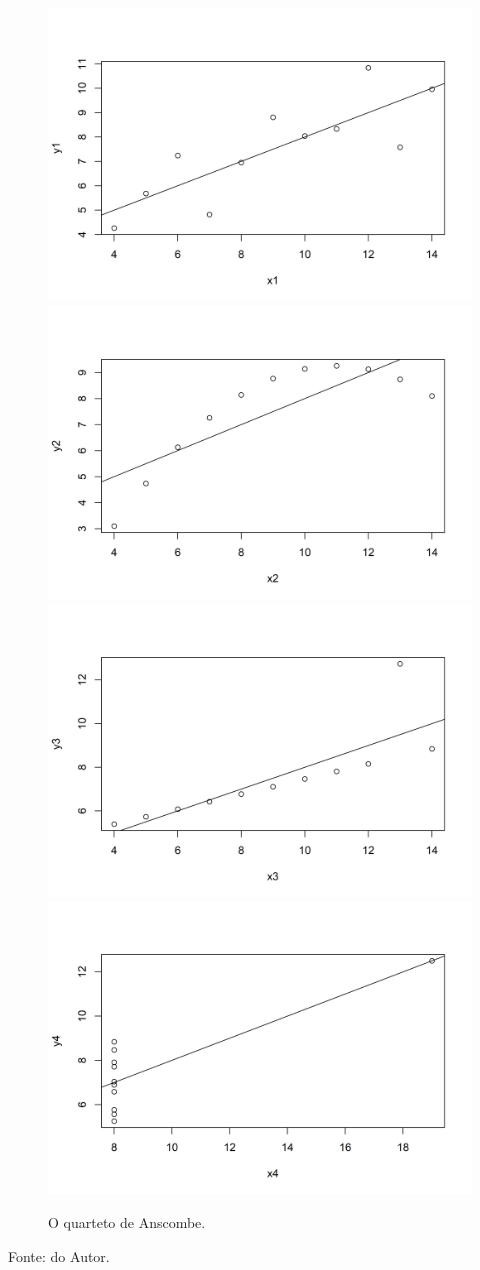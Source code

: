 \documentclass[
	12pt,				%
	oneside,			%
	a4paper,			%
	chapter=TITLE,		%
	section=TITLE,		%
	english,			%
	brazil				%
	]{abntex2}
\newcommand{\bcenter}{\begin{center}}
\newcommand{\ecenter}{\end{center}}
\begin{document}
\begin{figure}[H]

{\centering \includegraphics[width=0.49\linewidth]{images/anscombe-1} \includegraphics[width=0.49\linewidth]{images/anscombe-2} \includegraphics[width=0.49\linewidth]{images/anscombe-3} \includegraphics[width=0.49\linewidth]{images/anscombe-4} 

}

\caption{O quarteto de Anscombe.}\label{fig:anscombe}
\end{figure}
\bcenter

Fonte: do Autor.
\ecenter
\end{document}
